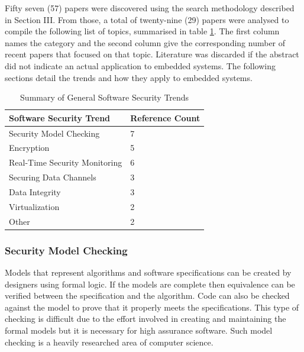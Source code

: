 \documentclass[final,conference,11pt]{IEEEtran}
\begin{document}
Fifty seven (57) papers were discovered using the search methodology described in Section III.  From those, a total of twenty-nine (29) papers were analysed to compile the following list of topics, summarised in table \ref{tab:trend_summary}.  The first column names the category and the second column give the corresponding number of recent papers that focused on that topic. Literature was discarded if the abstract did not indicate an actual application to embedded systems.  The following sections detail  the trends and how they apply to embedded systems.

\begin{table}[!t]
\renewcommand{\arraystretch}{1.3}
\caption{Summary of General Software Security Trends}
\label{tab:trend_summary}
\centering
\begin{tabular}{ | l | l | }
\hline
 Software Security Trend & Reference Count \\ \hline
 Security Model Checking			& 7	\\ \hline
 Encryption						& 5	\\ \hline
 Real-Time Security Monitoring	& 6	\\ \hline
 Securing Data Channels			& 3	\\ \hline
 Data Integrity					& 3	\\ \hline
 Virtualization					& 2	\\ \hline	
 Other							& 2	\\ \hline
\end{tabular}
\end{table}

\subsubsection{Security Model Checking}
Models that represent algorithms and software specifications can be created by designers using formal logic.  If the models are complete then equivalence can be verified between the specification and the algorithm. Code can also be checked against the model to prove that it properly meets the specifications.  This type of checking is difficult due to the effort involved in creating and maintaining the formal models but it is necessary for high assurance software.  Such model checking is a heavily researched area of computer science.  
\end{document}
